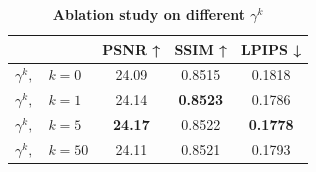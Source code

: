 \begin{table}[t]
\centering
\small
\caption{\textbf{Ablation study on different $\gamma^k$}}
\label{tab:gamma}
\begin{tabular}{lccc}
    \toprule
      & PSNR ↑ & SSIM ↑ & LPIPS ↓ \\
    \midrule
    $\gamma^k, \quad k = 0$ &24.09  &0.8515  &0.1818  \\
    $\gamma^k, \quad k = 1$ &24.14  &\textbf{0.8523}  &0.1786  \\
    $\gamma^k, \quad k = 5$ &\textbf{24.17}  &0.8522  &\textbf{0.1778}  \\
    $\gamma^k, \quad k = 50$ & 24.11  & 0.8521  &0.1793  \\
    \bottomrule
\end{tabular}
\end{table}